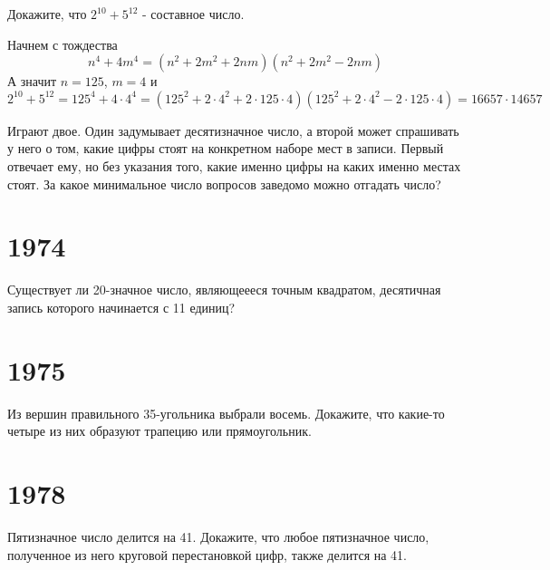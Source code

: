 \documentclass[11pt, a4paper]{problems_template}
\begin{document}
\begin{exercise}[10]
Докажите, что $2^{10} + 5^{12}$ - составное число.
\end{exercise}

\begin{Solution}
Начнем с тождества
$$
n^{4} + 4m^{4} = (n^{2} + 2m^{2} + 2nm)(n^{2} + 2m^{2} - 2nm)
$$
А значит $n = 125$, $m = 4$ и
$$
2^{10} + 5^{12} = 125^{4} + 4 \cdot 4^{4} = (125^{2} + 2 \cdot 4^{2} + 2 \cdot 125 \cdot 4)(125^{2} + 2 \cdot 4^{2} - 2 \cdot 125 \cdot 4) = 16657 \cdot 14657
$$
\end{Solution}

\begin{exercise}[37]
Играют двое. Один задумывает десятизначное число, а второй может спрашивать у него о том, какие цифры стоят на конкретном наборе мест в записи. Первый отвечает ему, но без указания того, какие именно цифры на каких именно местах стоят. За какое минимальное число вопросов заведомо можно отгадать число?
\end{exercise}


\chapter{1974}

\begin{exercise}[25]
Существует ли 20-значное число, являющеееся точным квадратом, десятичная запись которого начинается с 11 единиц?
\end{exercise}

\chapter{1975}

\begin{exercise}[36]
Из вершин правильного 35-угольника выбрали восемь. Докажите, что какие-то четыре из них образуют трапецию или прямоугольник.
\end{exercise}


\chapter{1978}

\begin{exercise}[14]
Пятизначное число делится на 41. Докажите, что любое пятизначное число, полученное из него круговой перестановкой цифр, также делится на 41.
\end{exercise}
\end{document}
